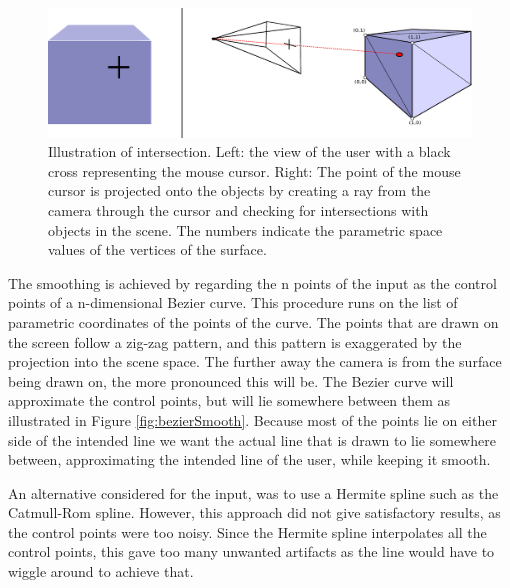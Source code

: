 \documentclass[a4paper,12pt]{report}
\begin{document}
 \begin{figure}
\centering
 \includegraphics[width=\linewidth]{thesis/intersection.pdf}
 \caption{Illustration of intersection. Left: the view of the user with a black cross representing the mouse cursor. Right: The point of the mouse cursor is projected onto the objects by creating a ray from the camera through the cursor and checking for intersections with objects in the scene. The numbers indicate the parametric space values of the vertices of the surface.}
 \label{fig:intersect}
\end{figure}

The smoothing is achieved by regarding the n points of the  input as the control points of a n-dimensional Bezier curve. This procedure runs on the list of parametric coordinates of the points of the curve. The points that are drawn on the screen follow a zig-zag pattern, and this pattern is exaggerated by the projection into the scene space. The further away the camera is from the surface being drawn on, the more pronounced this will be. The Bezier curve will approximate the control points, but will lie somewhere between them as illustrated in Figure \ref{fig:bezierSmooth}. Because most of the points lie on either side of the intended line we want the actual line that is drawn to lie somewhere between, approximating the intended line of the user, while keeping it smooth.

An alternative considered for the input, was to use a Hermite spline such as the Catmull-Rom spline. However, this approach did not give satisfactory results, as the control points were too noisy. Since the Hermite spline interpolates all the control points, this gave too many unwanted artifacts as the line would have to wiggle around to achieve that.
\end{document}
